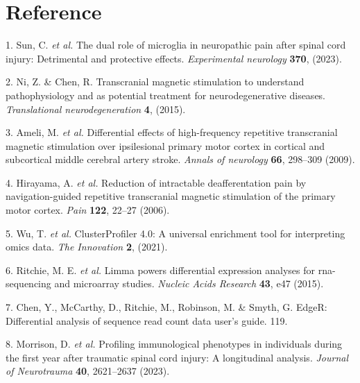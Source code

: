 \documentclass[
]{article}
\newenvironment{cslreferences}%
  {}%
  {\par}
\begin{document}
\hypertarget{bibliography}{%
\section*{Reference}\label{bibliography}}

\hypertarget{refs}{}
\begin{cslreferences}
\leavevmode\hypertarget{ref-TheDualRoleOSunC2023}{}%
1. Sun, C. \emph{et al.} The dual role of microglia in neuropathic pain after spinal cord injury: Detrimental and protective effects. \emph{Experimental neurology} \textbf{370}, (2023).

\leavevmode\hypertarget{ref-TranscranialMaNiZh2015}{}%
2. Ni, Z. \& Chen, R. Transcranial magnetic stimulation to understand pathophysiology and as potential treatment for neurodegenerative diseases. \emph{Translational neurodegeneration} \textbf{4}, (2015).

\leavevmode\hypertarget{ref-DifferentialEfAmeli2009}{}%
3. Ameli, M. \emph{et al.} Differential effects of high-frequency repetitive transcranial magnetic stimulation over ipsilesional primary motor cortex in cortical and subcortical middle cerebral artery stroke. \emph{Annals of neurology} \textbf{66}, 298--309 (2009).

\leavevmode\hypertarget{ref-ReductionOfInHiraya2006}{}%
4. Hirayama, A. \emph{et al.} Reduction of intractable deafferentation pain by navigation-guided repetitive transcranial magnetic stimulation of the primary motor cortex. \emph{Pain} \textbf{122}, 22--27 (2006).

\leavevmode\hypertarget{ref-ClusterprofilerWuTi2021}{}%
5. Wu, T. \emph{et al.} ClusterProfiler 4.0: A universal enrichment tool for interpreting omics data. \emph{The Innovation} \textbf{2}, (2021).

\leavevmode\hypertarget{ref-LimmaPowersDiRitchi2015}{}%
6. Ritchie, M. E. \emph{et al.} Limma powers differential expression analyses for rna-sequencing and microarray studies. \emph{Nucleic Acids Research} \textbf{43}, e47 (2015).

\leavevmode\hypertarget{ref-EdgerDifferenChen}{}%
7. Chen, Y., McCarthy, D., Ritchie, M., Robinson, M. \& Smyth, G. EdgeR: Differential analysis of sequence read count data user's guide. 119.

\leavevmode\hypertarget{ref-ProfilingImmunMorris2023}{}%
8. Morrison, D. \emph{et al.} Profiling immunological phenotypes in individuals during the first year after traumatic spinal cord injury: A longitudinal analysis. \emph{Journal of Neurotrauma} \textbf{40}, 2621--2637 (2023).
\end{cslreferences}
\end{document}
